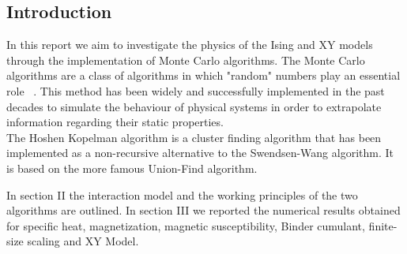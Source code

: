 \documentclass[twoside]{article}
\begin{document}
\begin{multicols}{2} %

\section{Introduction}
In this report we aim to investigate the physics of the Ising and XY models through the implementation of Monte Carlo algorithms.
The Monte Carlo algorithms are a class of algorithms in which "random" numbers play an essential role ~\cite{thijssen}. This method has been widely and successfully implemented in the past decades to simulate the behaviour of physical systems in order to extrapolate information regarding their static properties. \\
The Hoshen Kopelman algorithm is a cluster finding algorithm that has been implemented as a non-recursive alternative to the Swendsen-Wang algorithm. It is based on the more famous Union-Find algorithm.

In section II the interaction model and the working principles of the two algorithms are outlined. In section III we reported the numerical results obtained for specific heat, magnetization, magnetic susceptibility, Binder cumulant, finite-size scaling and XY Model.


\end{multicols}
\end{document}
